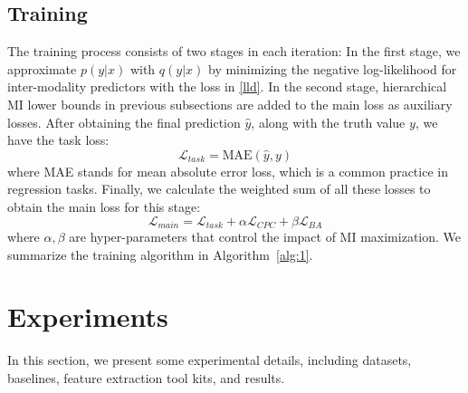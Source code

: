 \documentclass[11pt]{article}
\begin{document}
\subsection{Training}
The training process consists of two stages in each iteration:
In the first stage, we approximate $p(y|x)$ with $q(y|x)$ by minimizing the negative log-likelihood for inter-modality predictors with the loss in \eqref{lld}.
In the second stage, hierarchical MI lower bounds in previous subsections are added to the main loss as auxiliary losses.
After obtaining the final prediction $\hat{y}$, along with the truth value $y$, we have the task loss: 
\begin{equation}
    \mathcal{L}_{task} = \textrm{MAE}(\hat{y}, y)
\end{equation}
where MAE stands for mean absolute error loss, which is a common practice in regression tasks. 
Finally, we calculate the weighted sum of all these losses to obtain the main loss for this stage:
\begin{equation} \label{main loss}
    \mathcal{L}_{main} = \mathcal{L}_{task} + \alpha \mathcal{L}_{CPC} + \beta \mathcal{L}_{BA}
\end{equation}
where $\alpha, \beta$ are hyper-parameters that control the impact of MI maximization.
We summarize the training algorithm in Algorithm~\ref{alg:1}.


 \section{Experiments}
In this section, we present some experimental details, including datasets, baselines, feature extraction tool kits, and results.
\end{document}
